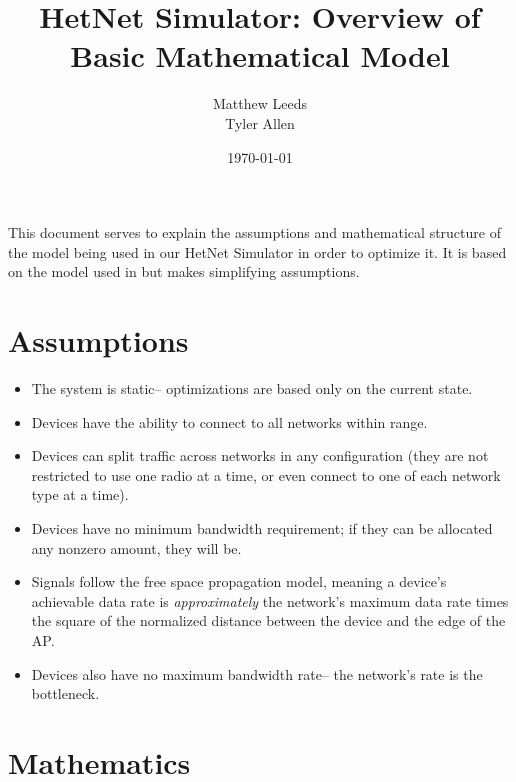 \documentclass[11pt]{article}
\title{HetNet Simulator: Overview of Basic Mathematical Model}
\author{Matthew Leeds\\
		Tyler Allen\\}
\date{\today}
\begin{document}
\maketitle
This document serves to explain the assumptions and mathematical structure of the model being used in our HetNet Simulator in order to optimize it. It is based on the model used in \cite{amin13} but makes simplifying assumptions.
\section{Assumptions}

\begin{itemize}
\item The system is static-- optimizations are based only on the current state.
\item Devices have the ability to connect to all networks within range.
\item Devices can split traffic across networks in any configuration (they are not restricted to use one radio at a time, or even connect to one of each network type at a time).
\item Devices have no minimum bandwidth requirement; if they can be allocated any nonzero amount, they will be.
\item Signals follow the free space propagation model, meaning a device's achievable data rate is \textit{approximately} the network's maximum data rate times the square of the normalized distance between the device and the edge of the AP. 
\item Devices also have no maximum bandwidth rate-- the network's rate is the bottleneck.
\end{itemize}

\section{Mathematics}
\end{document}
